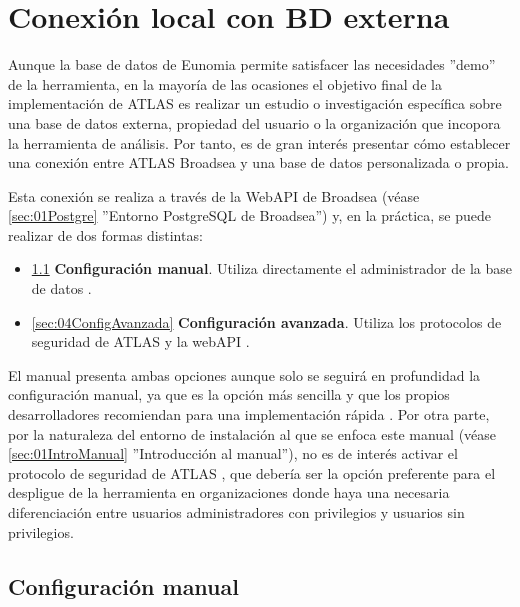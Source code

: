 \chapter{Conexión local con BD externa} \label{cap:04BDEXt}

Aunque la base de datos de Eunomia permite satisfacer las necesidades ''demo'' de la herramienta, en la mayoría de las ocasiones el objetivo final de la implementación de ATLAS es realizar un estudio o investigación específica sobre una base de datos externa, propiedad del usuario o la organización que incopora la herramienta de análisis. Por tanto, es de gran interés presentar cómo establecer una conexión entre ATLAS Broadsea y una base de datos personalizada o propia. 

Esta conexión se realiza a través de la WebAPI de Broadsea (véase \ref{sec:01Postgre} ''Entorno PostgreSQL de Broadsea'') y, en la práctica, se puede realizar de dos formas distintas: 

\begin{itemize}
    \item \ref{sec:04ConfigManual} \textbf{Configuración manual}. Utiliza directamente el administrador de la base de datos . 
    \item \ref{sec:04ConfigAvanzada} \textbf{Configuración avanzada}. Utiliza los protocolos de seguridad de ATLAS y la webAPI .
\end{itemize}

El manual presenta ambas opciones aunque solo se seguirá en profundidad la configuración manual, ya que es la opción más sencilla y que los propios desarrolladores recomiendan para una implementación rápida \parencite{forumAddMSDB}. Por otra parte, por la naturaleza del entorno de instalación al que se enfoca este manual (véase \ref{sec:01IntroManual} ''Introducción al manual''), no es de interés activar el protocolo de seguridad de ATLAS , que debería ser la opción preferente para el despligue de la herramienta en organizaciones donde haya una necesaria diferenciación entre usuarios administradores con privilegios y usuarios sin privilegios. 


\section{Configuración manual} \label{sec:04ConfigManual}

